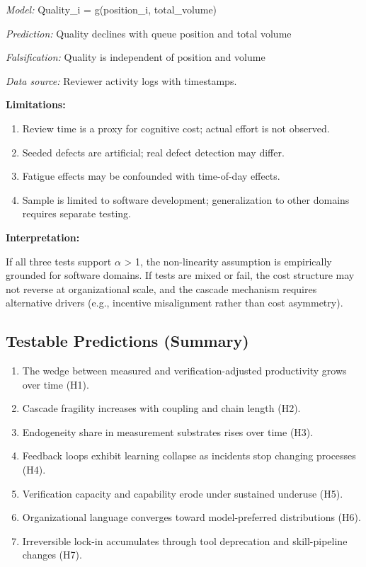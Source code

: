 \documentclass[11pt,a4paper]{article}
\providecommand{\tightlist}{\setlength{\itemsep}{0pt}\setlength{\parskip}{0pt}}
\begin{document}
\emph{Model:} Quality\_i = g(position\_i, total\_volume)

\emph{Prediction:} Quality declines with queue position and total volume

\emph{Falsification:} Quality is independent of position and volume

\emph{Data source:} Reviewer activity logs with timestamps.

\textbf{Limitations:}

\begin{enumerate}
\def\labelenumi{\arabic{enumi}.}
\tightlist
\item
  Review time is a proxy for cognitive cost; actual effort is not observed.
\item
  Seeded defects are artificial; real defect detection may differ.
\item
  Fatigue effects may be confounded with time-of-day effects.
\item
  Sample is limited to software development; generalization to other domains requires separate testing.
\end{enumerate}

\textbf{Interpretation:}

If all three tests support $\alpha$ > 1, the non-linearity assumption is empirically grounded for software domains. If tests are mixed or fail, the cost structure may not reverse at organizational scale, and the cascade mechanism requires alternative drivers (e.g., incentive misalignment rather than cost asymmetry).

\hypertarget{testable-predictions-summary}{%
\subsection{Testable Predictions (Summary)}\label{testable-predictions-summary}}

\begin{enumerate}
\def\labelenumi{\arabic{enumi}.}
\tightlist
\item
  The wedge between measured and verification-adjusted productivity grows over time (H1).
\item
  Cascade fragility increases with coupling and chain length (H2).
\item
  Endogeneity share in measurement substrates rises over time (H3).
\item
  Feedback loops exhibit learning collapse as incidents stop changing processes (H4).
\item
  Verification capacity and capability erode under sustained underuse (H5).
\item
  Organizational language converges toward model-preferred distributions (H6).
\item
  Irreversible lock-in accumulates through tool deprecation and skill-pipeline changes (H7).
\end{enumerate}
\end{document}
